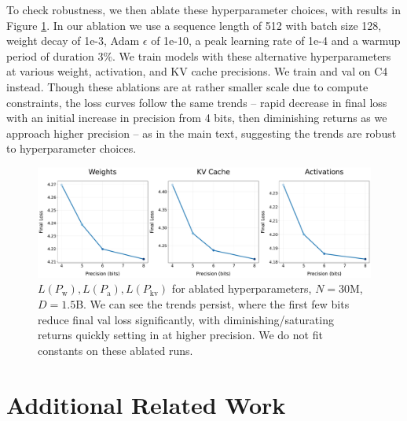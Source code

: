 \documentclass[11pt]{article}
\begin{document}
To check robustness, we then ablate these hyperparameter choices, with results in Figure \ref{fig:hyper-ablations}. In our ablation we use a sequence length of 512 with batch size 128, weight decay of 1e-3, Adam $\epsilon$ of 1e-10, a peak learning rate of 1e-4 and a warmup period of duration 3\%. We train models with these alternative hyperparameters at various weight, activation, and KV cache precisions. We train and val on C4~\citep{raffel2020exploring,dodge2021documenting} instead. Though these ablations are at rather smaller scale due to compute constraints, the loss curves follow the same trends -- rapid decrease in final loss with an initial increase in precision from 4 bits, then diminishing returns as we approach higher precision -- as in the main text, suggesting the trends are robust to hyperparameter choices. 


\begin{figure}
    \centering
    \includegraphics[width=\linewidth]{hyper_ablations.pdf}
    \caption{$L(P_\text{w}), L(P_\text{a}), L(P_\text{kv})$ for ablated hyperparameters, $N=30$M, $D = 1.5$B. We can see the trends persist, where the first few bits reduce final val loss significantly, with diminishing/saturating returns quickly setting in at higher precision. We do not fit constants on these ablated runs. }
    \label{fig:hyper-ablations}
\end{figure}

\section{Additional Related Work}
\label{appdx: addrel}
\end{document}
